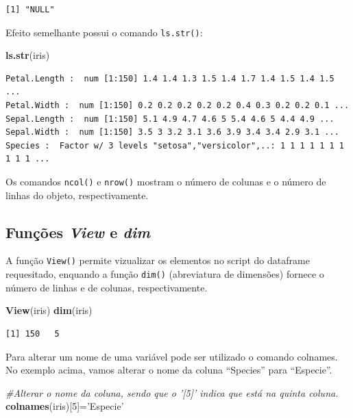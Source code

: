 \documentclass[12pt,portuguese,oneside]{book}
\newenvironment{Shaded}{\begin{snugshade}}{\end{snugshade}}
\newcommand{\KeywordTok}[1]{\textcolor[rgb]{0.13,0.29,0.53}{\textbf{#1}}}
\newcommand{\DecValTok}[1]{\textcolor[rgb]{0.00,0.00,0.81}{#1}}
\newcommand{\StringTok}[1]{\textcolor[rgb]{0.31,0.60,0.02}{#1}}
\newcommand{\CommentTok}[1]{\textcolor[rgb]{0.56,0.35,0.01}{\textit{#1}}}
\newcommand{\NormalTok}[1]{#1}
\begin{document}
\begin{verbatim}
[1] "NULL"
\end{verbatim}

Efeito semelhante possui o comando \texttt{ls.str()}:

\begin{Shaded}
\begin{Highlighting}[]
\KeywordTok{ls.str}\NormalTok{(iris)}
\end{Highlighting}
\end{Shaded}

\begin{verbatim}
Petal.Length :  num [1:150] 1.4 1.4 1.3 1.5 1.4 1.7 1.4 1.5 1.4 1.5 ...
Petal.Width :  num [1:150] 0.2 0.2 0.2 0.2 0.2 0.4 0.3 0.2 0.2 0.1 ...
Sepal.Length :  num [1:150] 5.1 4.9 4.7 4.6 5 5.4 4.6 5 4.4 4.9 ...
Sepal.Width :  num [1:150] 3.5 3 3.2 3.1 3.6 3.9 3.4 3.4 2.9 3.1 ...
Species :  Factor w/ 3 levels "setosa","versicolor",..: 1 1 1 1 1 1 1 1 1 1 ...
\end{verbatim}

Os comandos \texttt{ncol()} e \texttt{nrow()} mostram o número de
colunas e o número de linhas do objeto, respectivamente.

\subsection{\texorpdfstring{Funções \emph{View} e
\emph{dim}}{Funções View e dim}}\label{funcoes-view-e-dim}

A função \texttt{View()} permite vizualizar os elementos no script do
dataframe requesitado, enquando a função \texttt{dim()} (abreviatura de
dimensões) fornece o número de linhas e de colunas, respectivamente.

\begin{Shaded}
\begin{Highlighting}[]
\KeywordTok{View}\NormalTok{(iris)}
\KeywordTok{dim}\NormalTok{(iris)}
\end{Highlighting}
\end{Shaded}

\begin{verbatim}
[1] 150   5
\end{verbatim}

Para alterar um nome de uma variável pode ser utilizado o comando
colnames. No exemplo acima, vamos alterar o nome da coluna ``Species''
para ``Especie''.

\begin{Shaded}
\begin{Highlighting}[]
\CommentTok{#Alterar o nome da coluna, sendo que o '[5]' indica que está na quinta coluna.}
\KeywordTok{colnames}\NormalTok{(iris)[}\DecValTok{5}\NormalTok{]=}\StringTok{'Especie'}
\end{Highlighting}
\end{Shaded}
\end{document}
